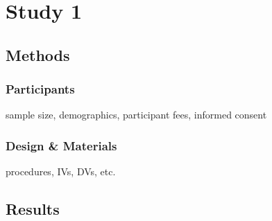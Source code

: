 \section{Study 1}

\subsection{Methods}

\subsubsection{Participants}

sample size, demographics, participant fees, informed consent

\subsubsection{Design \& Materials}

procedures, IVs, DVs, etc.

\subsection{Results}

